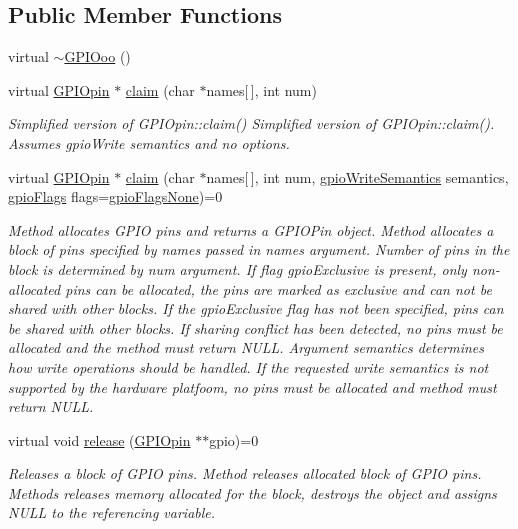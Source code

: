 \subsection*{Public Member Functions}
\begin{DoxyCompactItemize}
\item 
virtual \hyperlink{class_g_p_i_ooo_a99319510b178ed4e1dfc448e53a6c4b3}{$\sim$\-G\-P\-I\-Ooo} ()
\item 
virtual \hyperlink{class_g_p_i_opin}{G\-P\-I\-Opin} $\ast$ \hyperlink{class_g_p_i_ooo_a07164321fda879306394d7550454dbb2}{claim} (char $\ast$names\mbox{[}$\,$\mbox{]}, int num)
\begin{DoxyCompactList}\small\item\em Simplified version of G\-P\-I\-Opin\-::claim() Simplified version of G\-P\-I\-Opin\-::claim(). Assumes {\itshape gpio\-Write} semantics and no options. \end{DoxyCompactList}\item 
virtual \hyperlink{class_g_p_i_opin}{G\-P\-I\-Opin} $\ast$ \hyperlink{class_g_p_i_ooo_a8d7ac44872a6d12ad439afe4e914f07e}{claim} (char $\ast$names\mbox{[}$\,$\mbox{]}, int num, \hyperlink{class_g_p_i_ooo_ad4b133662b68989435bcd422feb0fc03}{gpio\-Write\-Semantics} semantics, \hyperlink{class_g_p_i_ooo_a63b72558d40ed7f3ccc0c6f11d1e3b10}{gpio\-Flags} flags=\hyperlink{class_g_p_i_ooo_a63b72558d40ed7f3ccc0c6f11d1e3b10aa64ecca268265aa77389ee957e01fd63}{gpio\-Flags\-None})=0
\begin{DoxyCompactList}\small\item\em Method allocates G\-P\-I\-O pins and returns a G\-P\-I\-O\-Pin object. Method allocates a block of pins specified by names passed in {\itshape names} argument. Number of pins in the block is determined by {\itshape num} argument. If flag {\itshape gpio\-Exclusive} is present, only non-\/allocated pins can be allocated, the pins are marked as exclusive and can not be shared with other blocks. If the {\itshape gpio\-Exclusive} flag has not been specified, pins can be shared with other blocks. If sharing conflict has been detected, no pins must be allocated and the method must return N\-U\-L\-L. Argument {\itshape semantics} determines how write operations should be handled. If the requested write semantics is not supported by the hardware platfoom, no pins must be allocated and method must return N\-U\-L\-L. \end{DoxyCompactList}\item 
virtual void \hyperlink{class_g_p_i_ooo_ab8a52d0d5ef2fbb9ca92baa51174e3ee}{release} (\hyperlink{class_g_p_i_opin}{G\-P\-I\-Opin} $\ast$$\ast$gpio)=0
\begin{DoxyCompactList}\small\item\em Releases a block of G\-P\-I\-O pins. Method releases allocated block of G\-P\-I\-O pins. Methods releases memory allocated for the block, destroys the object and assigns N\-U\-L\-L to the referencing variable. \end{DoxyCompactList}\end{DoxyCompactItemize}
